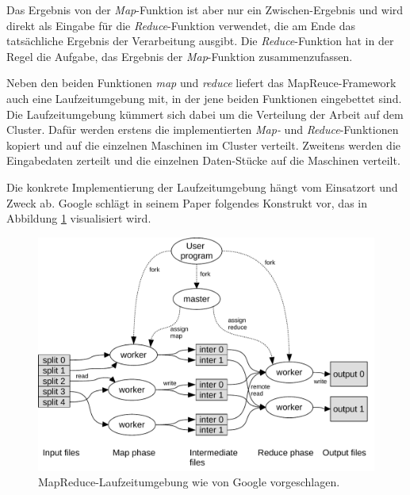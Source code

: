Das Ergebnis von der \textit{Map}-Funktion ist aber nur ein Zwischen-Ergebnis und wird direkt als Eingabe für die \textit{Reduce}-Funktion verwendet,
die am Ende das tatsächliche Ergebnis der Verarbeitung ausgibt. Die \textit{Reduce}-Funktion hat in der Regel die Aufgabe, das Ergebnis der \textit{Map}-Funktion
zusammenzufassen.  


Neben den beiden Funktionen \textit{map} und \textit{reduce} liefert das MapReuce-Framework auch eine Laufzeitumgebung mit, in der jene beiden Funktionen eingebettet sind.
Die Laufzeitumgebung kümmert sich dabei um die Verteilung der Arbeit auf dem Cluster. 
Dafür werden erstens die implementierten \textit{Map-} und \textit{Reduce}-Funktionen
kopiert und auf die einzelnen Maschinen im Cluster verteilt. Zweitens werden die Eingabedaten zerteilt und die einzelnen Daten-Stücke auf die Maschinen verteilt. 

Die konkrete Implementierung der Laufzeitumgebung hängt vom Einsatzort und Zweck ab. 
Google schlägt in seinem Paper folgendes Konstrukt vor, das in Abbildung \ref{fig:mapreduce} visualisiert wird.

\begin{figure}
\centering
\includegraphics[width=1.0\textwidth]{images/mapreduce.pdf}
\caption{MapReduce-Laufzeitumgebung wie von Google vorgeschlagen. \cite{miner2012mapreduce}}
\label{fig:mapreduce}
\end{figure}


